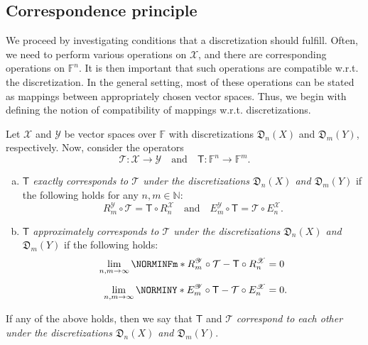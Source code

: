 \documentclass[a4paper]{paper}
\makeatletter
\newcommand*{\SPC}[1]{{\ensuremath{\mathscr{#1}}}}
\newcommand*{\SPCX}{\SPC{X}}
\newcommand*{\SPCY}{\SPC{Y}}
\newcommand*{\FIELD}{{\ensuremath{\mathbb{F}}}}
\newcommand*{\Fn}{{\ensuremath{\FIELD^n}}}
\newcommand*{\Fm}{{\ensuremath{\FIELD^m}}}
\newcommand{\NN}{{\ensuremath{\mathbb{N}}}}
\newcommand*{\OP}[1]{{\ensuremath{\mathcal{#1}}}}
\newcommand*{\OPT}{\OP{T}}
\newcommand{\DISCOP}[1]{{\ensuremath{\mathsf{#1}}}}
\newcommand*{\DISCOPT}{\DISCOP{T}}
\newcommand*{\EXT}[2]{\ensuremath{E_{#1}^{#2}}}
\newcommand*{\REST}[2]{\ensuremath{R_{#1}^{#2}}}
\newcommand*{\RnX}{{\ensuremath{\REST{n}{\SPC{X}}}}}
\newcommand*{\RmY}{{\ensuremath{\REST{m}{\SPC{Y}}}}}
\newcommand*{\EnX}{{\ensuremath{\EXT{n}{\SPC{X}}}}}
\newcommand*{\EmY}{{\ensuremath{\EXT{m}{\SPC{Y}}}}}
\newcommand*{\DISCR}[2]{{\ensuremath{\mathfrak{D}_{#1}(#2)}}}
\newcommand*{\DISCRnX}{\DISCR{n}{X}}
\newcommand*{\DISCRmY}{\DISCR{m}{Y}}
\newcommand*{\wrt}{{w.r.t.}\@\xspace}
\makeatother
\begin{document}
\subsection{Correspondence principle}
\label{subsec:discr:corresp}

We proceed by investigating conditions that a discretization should fulfill. Often, we need to perform various 
operations on $\SPCX$, and there are corresponding operations on $\Fn$. It is then important that such 
operations are compatible \wrt the discretization. In the general setting, most of these operations can be stated as 
mappings between appropriately chosen vector spaces. Thus, we begin with defining the notion of compatibility of 
mappings \wrt discretizations. 
%
\begin{definition}
 \label{def:discr:corresp:operator_compat}
 Let $\SPCX$ and $\SPCY$ be vector spaces over $\FIELD$ with discretizations $\DISCRnX$ and 
 $\DISCRmY$, respectively. Now, consider the operators
 \begin{equation*}
  \OPT \colon \SPCX \to \SPCY \quad\text{and}\quad \DISCOPT \colon \Fn \to \Fm.
 \end{equation*}
 \vspace{-2\baselineskip}
 \begin{enumerate}[(a)]
  \item \label{def:discr:corresp:operator_compat:a_exact}
  \emph{$\DISCOPT$ exactly corresponds to $\OPT$ under the discretizations $\DISCRnX$ and  
  $\DISCRmY$} if the following holds for any $n,m \in \NN$:
  \begin{equation*}
   \RmY \circ \OPT = \DISCOPT \circ \RnX  \quad\text{and}\quad  \EmY \circ \DISCOPT = \OPT \circ \EnX.
  \end{equation*}

  \item \label{def:discr:corresp:operator_compat:b_approx}
  \emph{$\DISCOPT$ approximately corresponds to $\OPT$ under the discretizations $\DISCRnX$ and 
  $\DISCRmY$} if the following holds:
  \begin{align*} 
   \lim_{n,m\to \infty} \NORMINFm*{\RmY \circ \OPT - \DISCOPT \circ \RnX} &= 0  \\[0.5em]
   \lim_{n,m\to \infty} \NORMINY*{\EmY \circ \DISCOPT - \OPT \circ \EnX} &= 0.
  \end{align*}
 \end{enumerate}  
 If any of the above holds, then we say that $\DISCOPT$ and $\OPT$ \emph{correspond to each other under the 
 discretizations $\DISCRnX$ and $\DISCRmY$}.
\end{definition}
\end{document}
